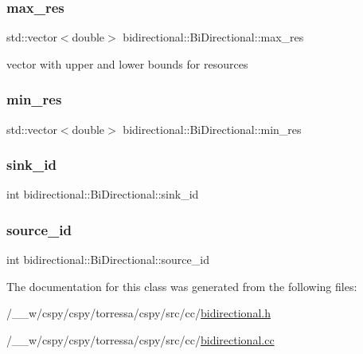 \subsubsection{\texorpdfstring{max\+\_\+res}{max\_res}}
{\footnotesize\ttfamily std\+::vector$<$double$>$ bidirectional\+::\+Bi\+Directional\+::max\+\_\+res}



vector with upper and lower bounds for resources 

\mbox{\label{classbidirectional_1_1BiDirectional_af144538113c466b21e18a128f1ffb18e}} 
\subsubsection{\texorpdfstring{min\+\_\+res}{min\_res}}
{\footnotesize\ttfamily std\+::vector$<$double$>$ bidirectional\+::\+Bi\+Directional\+::min\+\_\+res}

\mbox{\label{classbidirectional_1_1BiDirectional_a742976c94bdf77c2bfae680ffd2e468d}} 
\subsubsection{\texorpdfstring{sink\+\_\+id}{sink\_id}}
{\footnotesize\ttfamily int bidirectional\+::\+Bi\+Directional\+::sink\+\_\+id}

\mbox{\label{classbidirectional_1_1BiDirectional_ae8256189cc23d7033a5e8e36ac36ec4a}} 
\subsubsection{\texorpdfstring{source\+\_\+id}{source\_id}}
{\footnotesize\ttfamily int bidirectional\+::\+Bi\+Directional\+::source\+\_\+id}



The documentation for this class was generated from the following files\+:\begin{DoxyCompactItemize}
\item 
/\+\_\+\+\_\+w/cspy/cspy/torressa/cspy/src/cc/\hyperlink{bidirectional_8h}{bidirectional.\+h}\item 
/\+\_\+\+\_\+w/cspy/cspy/torressa/cspy/src/cc/\hyperlink{bidirectional_8cc}{bidirectional.\+cc}\end{DoxyCompactItemize}
